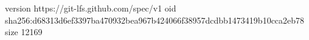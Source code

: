 version https://git-lfs.github.com/spec/v1
oid sha256:d68313d6ef3397ba470932bea967b424066f38957dcdbb1473419b10cca2eb78
size 12169
